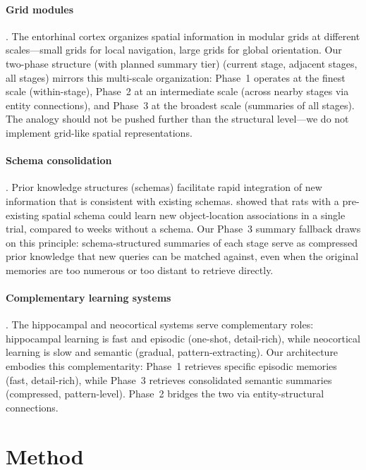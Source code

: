 \documentclass[11pt]{article}
\begin{document}
\paragraph{Grid modules} \citep{Stensola2012}.
The entorhinal cortex organizes spatial information in modular grids
at different scales---small grids for local navigation, large grids
for global orientation.  Our two-phase structure (with planned summary tier) (current stage,
adjacent stages, all stages) mirrors this multi-scale organization:
Phase~1 operates at the finest scale (within-stage), Phase~2 at an
intermediate scale (across nearby stages via entity connections), and
Phase~3 at the broadest scale (summaries of all stages).  The analogy
should not be pushed further than the structural level---we do not
implement grid-like spatial representations.

\paragraph{Schema consolidation} \citep{Tse2007}.
Prior knowledge structures (schemas) facilitate rapid integration of
new information that is consistent with existing schemas.
\citet{Tse2007} showed that rats with a pre-existing spatial schema
could learn new object-location associations in a single trial,
compared to weeks without a schema.  Our Phase~3 summary fallback
draws on this principle: schema-structured summaries of each stage
serve as compressed prior knowledge that new queries can be matched
against, even when the original memories are too numerous or too
distant to retrieve directly.

\paragraph{Complementary learning systems} \citep{McClelland1995}.
The hippocampal and neocortical systems serve complementary roles:
hippocampal learning is fast and episodic (one-shot, detail-rich),
while neocortical learning is slow and semantic (gradual,
pattern-extracting).  Our architecture embodies this complementarity:
Phase~1 retrieves specific episodic memories (fast, detail-rich),
while Phase~3 retrieves consolidated semantic summaries (compressed,
pattern-level).  Phase~2 bridges the two via entity-structural
connections.

\section{Method}
\label{sec:method}
\end{document}

